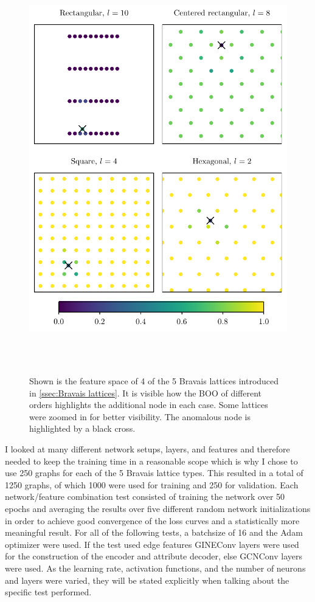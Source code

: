 \documentclass[11pt,a4paper]{article}
\begin{document}
\begin{figure}[htbp]
    \centering
    \includegraphics{images/plots/features_2d_lattices.pdf}
    \caption{Shown is the feature space of 4 of the 5 Bravais lattices introduced in \autoref{ssec:Bravais lattices}. It is visible how the BOO of different orders highlights the additional node in each case. Some lattices were zoomed in for better visibility. The anomalous node is highlighted by a black cross.}
    \label{fig:features_2d_lattices}
\end{figure}

I looked at many different network setups, layers, and features and therefore needed to keep the training time in a reasonable scope which is why I chose to use 250 graphs for each of the 5 Bravais lattice types. 
This resulted in a total of 1250 graphs, of which 1000 were used for training and 250 for validation. 
Each network/feature combination test consisted of training the network over 50 epochs and averaging the results over five different random network initializations in order to achieve good convergence of the loss curves and a statistically more meaningful result. 
For all of the following tests, a batchsize of 16 and the Adam optimizer were used. 
If the test used edge features GINEConv layers \cite{pygteamGINEConv2024} were used for the construction of the encoder and attribute decoder, else GCNConv layers \cite{pygteamGCNConv2025} were used.
As the learning rate, activation functions, and the number of neurons and layers were varied, they will be stated explicitly when talking about the specific test performed. \\
\end{document}

